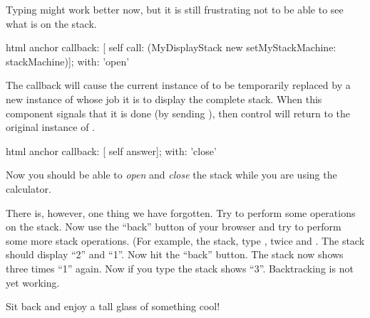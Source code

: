 \documentclass[a4paper,10pt,twoside]{book}
\begin{document}
Typing might work better now, but it is still frustrating not to be able to see what is on the stack.


\begin{code}{}
html anchor
	callback: [ self call: (MyDisplayStack new setMyStackMachine: stackMachine)];
	with: 'open'
\end{code}

The callback will cause the current instance of  to be temporarily replaced by a new instance of  whose job it is to display the complete stack.
When this component signals that it is done (\ie by sending ), then control will return to the original instance of .


\begin{code}{}
html anchor
	callback: [ self answer];
	with: 'close'
\end{code}

Now you should be able to \emph{open} and \emph{close} the stack while you are using the calculator.

There is, however, one thing we have forgotten.
Try to perform some operations on the stack.
Now use the ``back'' button of your browser and try to perform some more stack operations.
(For example,  the stack, type ,  twice and \menu {+}.
The stack should display ``2'' and ``1''.
Now hit the ``back'' button.
The stack now shows three times ``1'' again.
Now if you type \menu{+} the stack shows ``3''.
Backtracking is not yet working.


Sit back and enjoy a tall glass of something cool!

\end{document}
